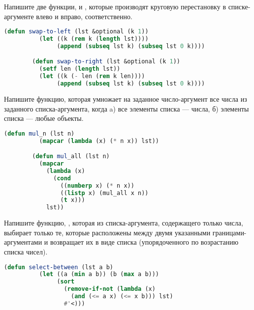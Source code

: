 \documentclass[a4paper,oneside,12pt]{extreport}
\begin{document}
\begin{task}
	Напишите две функции,  и , которые производят круговую перестановку в списке-аргументе влево и вправо, соответственно.

	\begin{lstlisting}[language=Lisp, gobble=16]
		(defun swap-to-left (lst &optional (k 1))
		  (let ((k (rem k (length lst))))
		       (append (subseq lst k) (subseq lst 0 k))))

		(defun swap-to-right (lst &optional (k 1))
		  (setf len (length lst))
		  (let ((k (- len (rem k len))))
		       (append (subseq lst k) (subseq lst 0 k))))
	\end{lstlisting}
\end{task}

\begin{task}
	Напишите функцию, которая умножает на заданное число-аргумент все числа из заданного списка-аргумента, когда
	a) все элементы списка — числа,
	б) элементы списка — любые объекты.

	\begin{lstlisting}[language=Lisp, gobble=16]
		(defun mul_n (lst n)
		  (mapcar (lambda (x) (* n x)) lst))

		(defun mul_all (lst n)
		  (mapcar
		    (lambda (x)
		      (cond
		        ((numberp x) (* n x))
		        ((listp x) (mul_all x n))
		        (t x)))
		    lst))
	\end{lstlisting}
\end{task}

\begin{task}
	Напишите функцию, , которая из списка-аргумента,
	содержащего только числа, выбирает только те, которые расположены между двумя указанными границами-аргументами и возвращает их в виде списка (упорядоченного по возрастанию списка чисел).

	\begin{lstlisting}[language=Lisp, gobble=16]
		(defun select-between (lst a b)
		  (let ((a (min a b)) (b (max a b)))
		       (sort
		         (remove-if-not (lambda (x)
		           (and (<= a x) (<= x b))) lst)
		         #'<)))
	\end{lstlisting}
\end{task}
\end{document}
